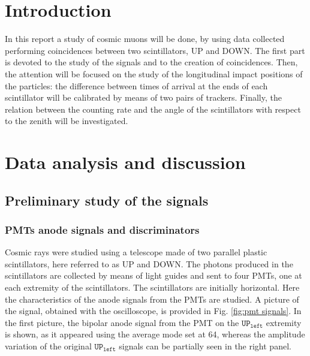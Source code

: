 \documentclass[a4paper]{article}
\begin{document}
\bigskip

\tableofcontents
\phantom{.}\vfill\phantom{.}
    
\thispagestyle{empty} %
\clearpage


\section{Introduction} 
\setcounter{page}{1}

In this report a study of cosmic muons will be done, by using data collected performing coincidences between two scintillators, UP and DOWN. The first part is devoted to the study of the signals and to the creation of coincidences. Then, the attention will be focused on the study of the longitudinal impact positions of the particles: the difference between times of arrival at the ends of each scintillator will be calibrated by means of two pairs of trackers. Finally, the relation between the counting rate and the angle of the scintillators with respect to the zenith will be investigated.


\section{Data analysis and discussion}
\subsection{Preliminary study of the signals}
\subsubsection{PMTs anode signals and discriminators}
Cosmic rays were studied using a telescope made of two parallel plastic scintillators, here referred to as UP and DOWN. The photons produced in the scintillators are collected by means of light guides and sent to four PMTs, one at each extremity of the scintillators. The scintillators are initially horizontal. 
Here the characteristics of the anode signals from the PMTs are studied. A picture of the signal, obtained with the oscilloscope, is provided in Fig. \ref{fig:pmt signals}. In the first picture, the bipolar anode signal from the PMT on the $\mathtt{UP_{left}}$ extremity is shown, as it appeared using the average mode set at 64, whereas the amplitude variation of the original $\mathtt{UP_{left}}$ signals can be partially seen in the right panel.%
 
\end{document}
